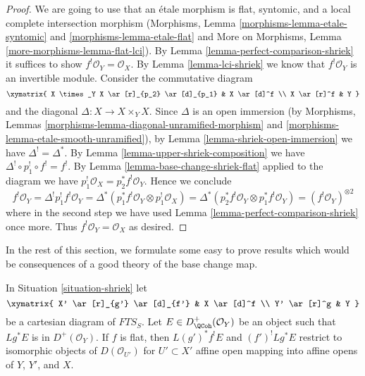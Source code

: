 \begin{proof}
We are going to use that an \'etale morphism is flat, syntomic,
and a local complete intersection morphism
(Morphisms, Lemma \ref{morphisms-lemma-etale-syntomic} and
\ref{morphisms-lemma-etale-flat} and
More on Morphisms, Lemma \ref{more-morphisms-lemma-flat-lci}).
By Lemma \ref{lemma-perfect-comparison-shriek} it suffices
to show $f^!\mathcal{O}_Y = \mathcal{O}_X$.
By Lemma \ref{lemma-lci-shriek} we know that $f^!\mathcal{O}_Y$
is an invertible module. Consider the commutative diagram
$$
\xymatrix{
X \times_Y X \ar[r]_{p_2} \ar[d]_{p_1} & X \ar[d]^f \\
X \ar[r]^f & Y
}
$$
and the diagonal $\Delta : X \to X \times_Y X$. Since $\Delta$
is an open immersion (by Morphisms, Lemmas
\ref{morphisms-lemma-diagonal-unramified-morphism} and
\ref{morphisms-lemma-etale-smooth-unramified}), by
Lemma \ref{lemma-shriek-open-immersion} we have $\Delta^! = \Delta^*$.
By Lemma \ref{lemma-upper-shriek-composition} we have
$\Delta^! \circ p_1^! \circ f^! = f^!$.
By Lemma \ref{lemma-base-change-shriek-flat} applied to
the diagram we have $p_1^!\mathcal{O}_X = p_2^*f^!\mathcal{O}_Y$.
Hence we conclude
$$
f^!\mathcal{O}_Y = \Delta^!p_1^!f^!\mathcal{O}_Y =
\Delta^*(p_1^*f^!\mathcal{O}_Y \otimes p_1^!\mathcal{O}_X) =
\Delta^*(p_2^*f^!\mathcal{O}_Y \otimes p_1^*f^!\mathcal{O}_Y) =
(f^!\mathcal{O}_Y)^{\otimes 2}
$$
where in the second step we have used
Lemma \ref{lemma-perfect-comparison-shriek} once more.
Thus $f^!\mathcal{O}_Y = \mathcal{O}_X$ as desired.
\end{proof}


\noindent
In the rest of this section, we formulate some easy to prove
results which would be consequences of a good theory of the
base change map.

\begin{lemma}
\label{lemma-base-change-locally}
In Situation \ref{situation-shriek} let
$$
\xymatrix{
X' \ar[r]_{g'} \ar[d]_{f'} & X \ar[d]^f \\
Y' \ar[r]^g & Y
}
$$
be a cartesian diagram of $\textit{FTS}_S$.
Let $E \in D^+_\QCoh(\mathcal{O}_Y)$ be an object
such that $Lg^*E$ is in $D^+(\mathcal{O}_Y)$.
If $f$ is flat, then $L(g')^*f^!E$ and $(f')^!Lg^*E$
restrict to isomorphic objects of $D(\mathcal{O}_{U'})$
for $U' \subset X'$ affine open mapping into affine opens of $Y$, $Y'$, and $X$.
\end{lemma}

